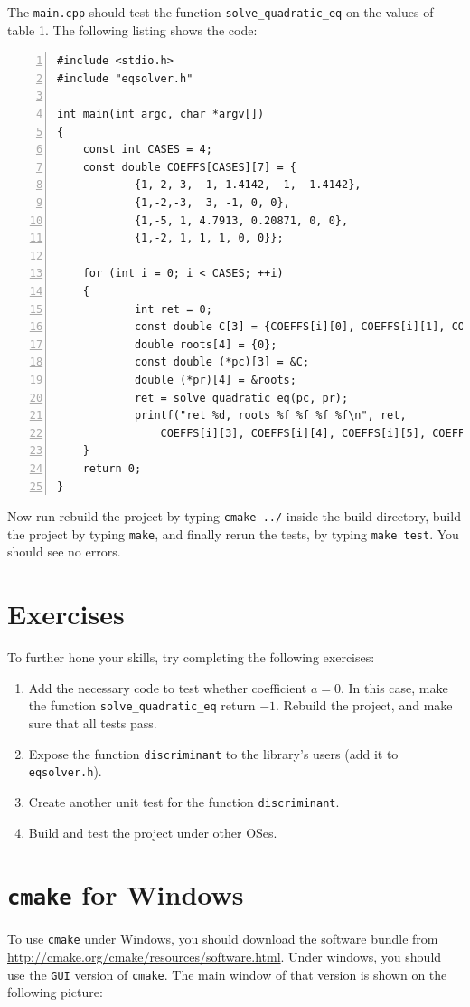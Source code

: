 \documentclass[12pt,a4paper]{article}
\begin{document}
The \verb+main.cpp+ should test the function \verb+solve_quadratic_eq+ on the values of table 1. The following listing shows the code:
\begin{lstlisting}[basicstyle=\small, numbers=left,caption=main.cpp,columns=flexible,keywordstyle=\color{black}\ttfamily]
#include <stdio.h>
#include "eqsolver.h"

int main(int argc, char *argv[])
{
	const int CASES = 4;
	const double COEFFS[CASES][7] = {
			{1, 2, 3, -1, 1.4142, -1, -1.4142},
			{1,-2,-3,  3, -1, 0, 0},
			{1,-5, 1, 4.7913, 0.20871, 0, 0},
			{1,-2, 1, 1, 1, 0, 0}};

	for (int i = 0; i < CASES; ++i)
	{
			int ret = 0;
			const double C[3] = {COEFFS[i][0], COEFFS[i][1], COEFFS[i][2]};
			double roots[4] = {0};
			const double (*pc)[3] = &C;
			double (*pr)[4] = &roots;
			ret = solve_quadratic_eq(pc, pr);
			printf("ret %d, roots %f %f %f %f\n", ret, 
				COEFFS[i][3], COEFFS[i][4], COEFFS[i][5], COEFFS[i][6]);
	}
	return 0;
}
\end{lstlisting}

Now run rebuild the project by typing \verb+cmake ../+ inside the build directory, build the project by typing \verb+make+, and finally rerun the tests, by typing \verb+make test+. You should see no errors.
\section{Exercises}
To further hone your skills, try completing the following exercises:
\begin{enumerate}
\item Add the necessary code to test whether coefficient $a=0$. In this case, make the function \verb+solve_quadratic_eq+ return $-1$. Rebuild the project, and make sure that all tests pass.
\item Expose the function \verb+discriminant+ to the library's users (add it to \verb+eqsolver.h+).
\item Create another unit test for the function \verb+discriminant+. 
\item Build and test the project under other OSes. 
\end{enumerate}

\section{\texttt{cmake} for Windows}
To use \verb+cmake+ under Windows, you should download the software bundle from \href{http://cmake.org/cmake/resources/software.html}{http://cmake.org/cmake/resources/software.html}. Under windows, you should use the \verb+GUI+ version of \verb+cmake+. The main window of that version is shown on the following picture:
\end{document}

